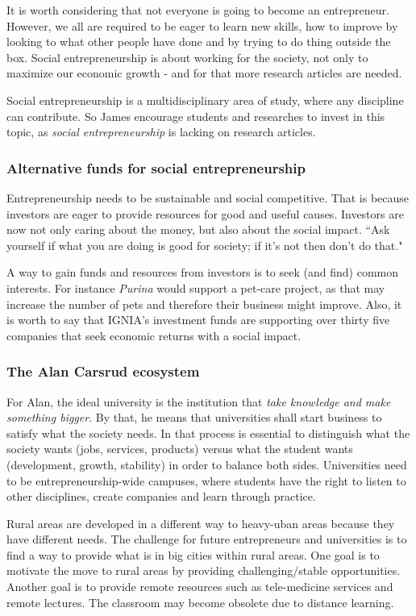 \documentclass[11pt,a4paper]{article}
\begin{document}
It is worth considering that not everyone is going to become an entrepreneur. However, we all are required to be eager to learn new skills, how to improve by looking to what other people have done and by trying to do thing outside the box. Social entrepreneurship is about working for the society, not only to maximize our economic growth - and for that more research articles are needed.

Social entrepreneurship is a multidisciplinary area of study, where any discipline can contribute. So James encourage students and researches to invest in this topic, as \emph{social entrepreneurship} is lacking on research articles.

\subsubsection*{Alternative funds for social entrepreneurship}
Entrepreneurship needs to be sustainable and social competitive. That is because investors are eager to provide resources for good and useful causes. Investors are now not only caring about the money, but also about the social impact. ``Ask yourself if what you are doing is good for society; if it's not then don't do that." \parencite{Carsrud2019}

A way to gain funds and resources from investors is to seek (and find) common interests. For instance \emph{Purina} would support a pet-care project, as that may increase the number of pets and therefore their business might improve. Also, it is worth to say that IGNIA's investment funds are supporting over thirty five companies that seek economic returns with a social impact.

\subsubsection*{The Alan Carsrud ecosystem}
For Alan, the ideal university is the institution that \emph{take knowledge and make something bigger}. By that, he means that universities shall start business to satisfy what the society needs. In that process is essential to distinguish what the society wants (jobs, services, products) versus what the student wants (development, growth, stability) in order to balance both sides. Universities need to be entrepreneurship-wide campuses, where students have the right to listen to other disciplines, create companies and learn through practice.

Rural areas are developed in a different way to heavy-uban areas because they have different needs. The challenge for future entrepreneurs and universities is to find a way to provide what is in big cities within rural areas. One goal is to motivate the move to rural areas by providing challenging/stable opportunities. Another goal is to provide remote resources such as tele-medicine services and remote lectures. The classroom may become obsolete due to distance learning.
\end{document}
